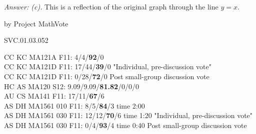 {\it Answer: (c).}  This is a reflection of the original graph through the line $y=x$.

\medskip
by Project MathVote

SVC.01.03.052

CC KC MA121A F11: 4/4/{\bf92}/0  \\
CC KC MA121D F11: 17/44/{\bf39}/0 "Individual, pre-discussion vote" \\
CC KC MA121D F11: 0/28/{\bf72}/0 Post small-group discussion vote \\
HC AS MA120 S12: 9.09/9.09/{\bf81.82}/0/0/0  \\
AU CS MA141 F11: 17/11/{\bf67}/6 \\
AS DH MA1561 010 F11: 8/5/{\bf84}/3 time 2:00  \\
AS DH MA1561 030 F11: 12/12/{\bf70}/6 time 1:20 "Individual, pre-discussion vote" \\
AS DH MA1561 030 F11: 0/4/{\bf93}/4 time 0:40 Post small-group discussion vote \\
